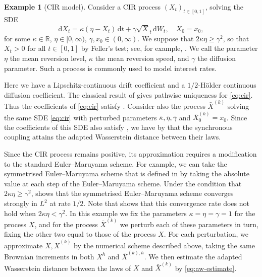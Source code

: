 \documentclass[onseside, final]{amsart}
\theoremstyle{definition}
\newtheorem{example}[theorem]{Example}
\newcommand{\R}{\mathbb R}
\newcommand{\D}{\,\mathrm{d}}
\newcommand{\ds}{\mathrm{d}}
\numberwithin{equation}{section}
\begin{document}
	\begin{example}[CIR model]\label{ex:cir}
		Consider a CIR process $(X_t)_{t \in [0, 1]}$, solving the SDE
		\begin{equation}\label{eq:cir}
			\ds X_t = \kappa(\eta - X_t)\D t + \gamma \sqrt X_t \D W_t, \quad X_0 = x_0,
		\end{equation}
		for some $\kappa \in \R$, $\eta \in [0, \infty)$, $\gamma, x_0 \in (0, \infty)$. We suppose that $2\kappa\eta \geq \gamma^2$, so that $X_t > 0$ for all $t \in [0, 1]$ by Feller's test; see, for example, \citep[Theorem 5.29]{KaSh91}. We call the parameter $\eta$ the mean reversion level, $\kappa$ the mean reversion speed, and $\gamma$ the diffusion parameter.
		Such a process is commonly used to model interest rates.
		
		Here we have a Lipschitz-continuous drift coefficient and a $1/2$-H\"older continuous diffusion coefficient. The classical result of \citet[Theorem 1]{YW} gives pathwise uniqueness for \eqref{eq:cir}. Thus the coefficients of \eqref{eq:cir} satisfy . Consider also the process $\bar X^{(k)}$ solving the same SDE \eqref{eq:cir} with perturbed parameters $\bar \kappa, \bar \eta, \bar \gamma$ and $\bar X^{(k)}_0 = x_0$. Since the coefficients of this SDE also satisfy , we have by  that the synchronous coupling attains the adapted Wasserstein distance between their laws.
		
		Since the CIR process remains positive, its approximation requires a modification to the standard Euler--Maruyama scheme. For example, we can take the symmetrised Euler--Maruyama scheme that is defined in \citet{BeBoDi08} by taking the absolute value at each step of the Euler--Maruyama scheme. Under the condition that $2\kappa \eta \geq \gamma^2$, \citep[Theorem 2.2]{BeBoDi08} shows that the symmetrised Euler--Maruyama scheme converges strongly in $L^2$ at rate $1/2$. Note that \cite[Theorem 1.1]{HeJe19} shows that this convergence rate does not hold when $2\kappa \eta < \gamma^2$.
		In this example we fix the parameters $\kappa =  \eta = \gamma = 1$ for the process $X$, and for the process $\bar X^{(k)}$ we perturb each of these parameters in turn, fixing the other two equal to those of the process $X$. For each perturbation, we approximate $X, \bar X^{(k)}$ by the numerical scheme described above, taking the same Brownian increments in both $X^h$ and $\bar X^{(k), h}$. We then estimate the adapted Wasserstein distance between the laws of $X$ and $\bar X^{(k)}$ by \eqref{eq:aw-estimate}.
					

\end{example}
\end{document}
